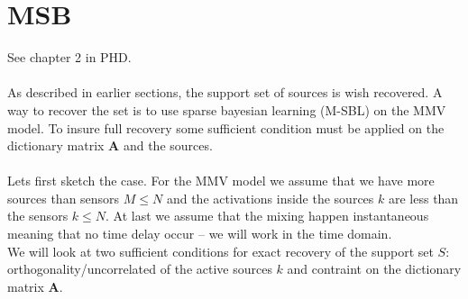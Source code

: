 \section{MSB}
See chapter 2 in PHD.
\\ \\
As described in earlier sections, the support set of sources is wish recovered. A way to recover the set is to use sparse bayesian learning (M-SBL) on the MMV model. To insure full recovery some sufficient condition must be applied on the dictionary matrix $\mathbf{A}$ and the sources. 
\\ \\
Lets first sketch the case. For the MMV model we assume that we have more sources than sensors $M \leq N$ and the activations inside the sources $k$ are less than the sensors $k \leq N$. At last we assume that the mixing happen instantaneous meaning that no time delay occur -- we will work in the time domain.
\\
We will look at two sufficient conditions for exact recovery of the support set $S$: orthogonality/uncorrelated of the active sources $k$ and contraint on the dictionary matrix $\mathbf{A}$.

